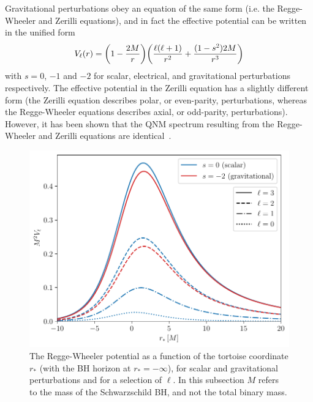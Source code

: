 Gravitational perturbations obey an equation of the same form (i.e. the Regge-Wheeler and Zerilli equations), and in fact the effective potential can be written in the unified form
\begin{equation}
    V_\ell(r) = \qty( 1 - \frac{2M}{r} ) \qty( \frac{\ell (\ell + 1)}{r^2} + \frac{(1 - s^2)2M}{r^3} )
\end{equation}
with $s = 0$, $-1$ and $-2$ for scalar, electrical, and gravitational perturbations respectively. 
The effective potential in the Zerilli equation has a slightly different form (the Zerilli equation describes polar, or even-parity, perturbations, whereas the Regge-Wheeler equations describes axial, or odd-parity, perturbations). 
However, it has been shown that the QNM spectrum resulting from the Regge-Wheeler and Zerilli equations are identical~\cite{Chandrasekhar:1975nkd}.

\begin{figure}[t]
    \centering
    \includegraphics[width=0.75\columnwidth]{Figures/Introduction/rw_potential.pdf}
    \caption[The Regge-Wheeler potential]{
    The Regge-Wheeler potential as a function of the tortoise coordinate $r_*$ (with the BH horizon at $r_* = -\infty$), for scalar and gravitational perturbations and for a selection of $\ell$. In this subsection $M$ refers to the mass of the Schwarzschild BH, and not the total binary mass.
    }
    \label{ch1:fig:rw_potential}
\end{figure}

